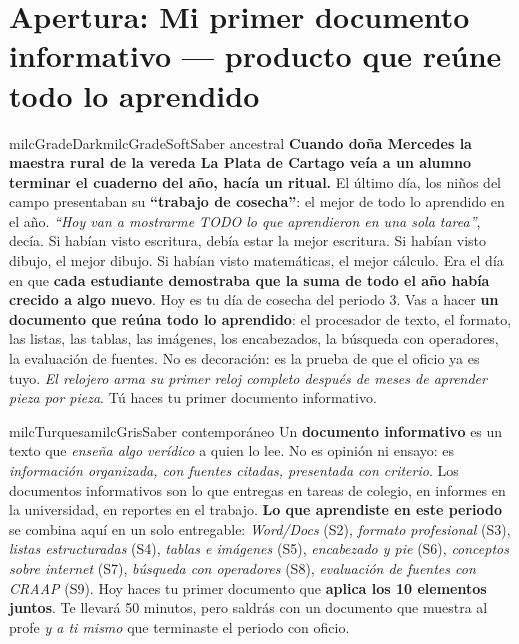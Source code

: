 \documentclass[11pt,letterpaper]{article}
\begin{document}
\newpage

\section*{Apertura: Mi primer documento informativo --- producto que reúne todo lo aprendido}

\begin{softbox}{milcGradeDark}{milcGradeSoft}{Saber ancestral}
\textbf{Cuando doña Mercedes la maestra rural de la vereda La Plata de Cartago veía a un alumno terminar el cuaderno del año, hacía un ritual.} El último día, los niños del campo presentaban su \textbf{``trabajo de cosecha''}: el mejor de todo lo aprendido en el año. \emph{``Hoy van a mostrarme TODO lo que aprendieron en una sola tarea''}, decía. Si habían visto escritura, debía estar la mejor escritura. Si habían visto dibujo, el mejor dibujo. Si habían visto matemáticas, el mejor cálculo. Era el día en que \textbf{cada estudiante demostraba que la suma de todo el año había crecido a algo nuevo}. Hoy es tu día de cosecha del periodo 3. Vas a hacer \textbf{un documento que reúna todo lo aprendido}: el procesador de texto, el formato, las listas, las tablas, las imágenes, los encabezados, la búsqueda con operadores, la evaluación de fuentes. No es decoración: es la prueba de que el oficio ya es tuyo. \emph{El relojero arma su primer reloj completo después de meses de aprender pieza por pieza}. Tú haces tu primer documento informativo.
\end{softbox}

\begin{softbox}{milcTurquesa}{milcGris}{Saber contemporáneo}
Un \textbf{documento informativo} es un texto que \emph{enseña algo verídico} a quien lo lee. No es opinión ni ensayo: es \emph{información organizada, con fuentes citadas, presentada con criterio}. Los documentos informativos son lo que entregas en tareas de colegio, en informes en la universidad, en reportes en el trabajo. \textbf{Lo que aprendiste en este periodo} se combina aquí en un solo entregable: \emph{Word/Docs} (S2), \emph{formato profesional} (S3), \emph{listas estructuradas} (S4), \emph{tablas e imágenes} (S5), \emph{encabezado y pie} (S6), \emph{conceptos sobre internet} (S7), \emph{búsqueda con operadores} (S8), \emph{evaluación de fuentes con CRAAP} (S9). Hoy haces tu primer documento que \textbf{aplica los 10 elementos juntos}. Te llevará 50 minutos, pero saldrás con un documento que muestra al profe \emph{y a ti mismo} que terminaste el periodo con oficio.
\end{softbox}
\end{document}
